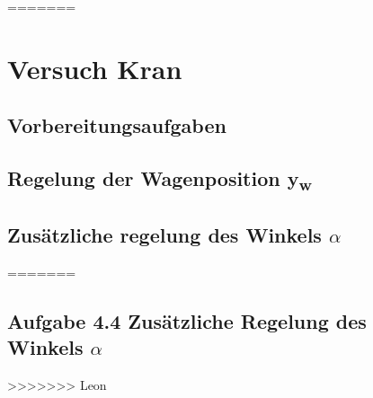 \documentclass[10pt]{scrartcl}
\begin{document}
\begin{figure}[H]  %
=======
\newpage
\section{Versuch Kran}
\subsection{Vorbereitungsaufgaben}
\subsection{Regelung der Wagenposition y\textsubscript{w}}
\subsection{Zusätzliche regelung des Winkels $\alpha$ }
=======
\subsection{Aufgabe 4.4 Zusätzliche Regelung des Winkels $\alpha$ }
>>>>>>> Leon

\end{figure}
\end{document}
